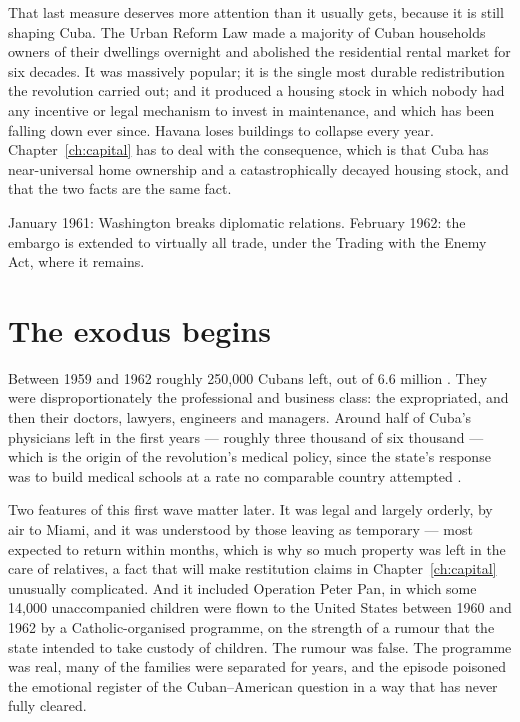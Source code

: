That last measure deserves more attention than it usually gets, because it is
still shaping Cuba. The Urban Reform Law made a majority of Cuban households
owners of their dwellings overnight and abolished the residential rental market
for six decades. It was massively popular; it is the single most durable
redistribution the revolution carried out; and it produced a housing stock in
which nobody had any incentive or legal mechanism to invest in maintenance, and
which has been falling down ever since. Havana loses buildings to collapse every
year. Chapter~\ref{ch:capital} has to deal with the consequence, which is that
Cuba has near-universal home ownership and a catastrophically decayed housing
stock, and that the two facts are the same fact.

January 1961: Washington breaks diplomatic relations. February 1962: the
embargo is extended to virtually all trade, under the Trading with the Enemy
Act, where it remains.

\section{The exodus begins}

Between 1959 and 1962 roughly 250,000 Cubans left, out of 6.6 million
\citep{eckstein2003}.\unv{}
They were disproportionately the professional and business class: the
expropriated, and then their doctors, lawyers, engineers and managers. Around
half of Cuba's physicians left in the first years --- roughly three thousand of
six thousand --- which is the origin of the revolution's medical policy, since
the state's response was to build medical schools at a rate no comparable
country attempted \citep{feinsilver1993}.\unv{}

Two features of this first wave matter later. It was legal and largely orderly,
by air to Miami, and it was understood by those leaving as temporary --- most
expected to return within months, which is why so much property was left in the
care of relatives, a fact that will make restitution claims in
Chapter~\ref{ch:capital} unusually complicated. And it included Operation Peter
Pan, in which some 14,000 unaccompanied children were flown to the United
States between 1960 and 1962 by a Catholic-organised programme, on the strength
of a rumour that the state intended to take custody of children. The rumour was
false. The programme was real, many of the families were separated for years,
and the episode poisoned the emotional register of the Cuban--American question
in a way that has never fully cleared.

